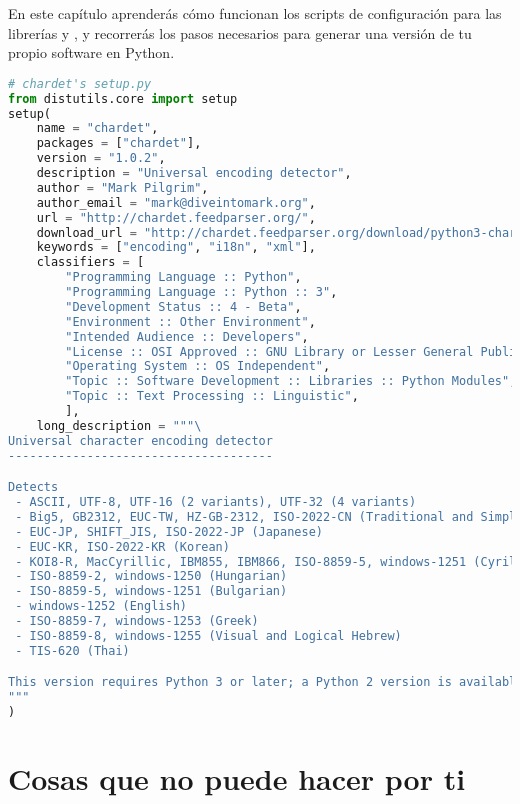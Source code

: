 En este capítulo aprenderás cómo funcionan los scripts de configuración para las librerías  y , y recorrerás los pasos necesarios para generar una versión de tu propio software en Python.

\begin{lstlisting}[language=Python,breaklines=true]
# chardet's setup.py
from distutils.core import setup
setup(
    name = "chardet",
    packages = ["chardet"],
    version = "1.0.2",
    description = "Universal encoding detector",
    author = "Mark Pilgrim",
    author_email = "mark@diveintomark.org",
    url = "http://chardet.feedparser.org/",
    download_url = "http://chardet.feedparser.org/download/python3-chardet-1.0.1.tgz",
    keywords = ["encoding", "i18n", "xml"],
    classifiers = [
        "Programming Language :: Python",
        "Programming Language :: Python :: 3",
        "Development Status :: 4 - Beta",
        "Environment :: Other Environment",
        "Intended Audience :: Developers",
        "License :: OSI Approved :: GNU Library or Lesser General Public License (LGPL)",
        "Operating System :: OS Independent",
        "Topic :: Software Development :: Libraries :: Python Modules",
        "Topic :: Text Processing :: Linguistic",
        ],
    long_description = """\
Universal character encoding detector
-------------------------------------

Detects
 - ASCII, UTF-8, UTF-16 (2 variants), UTF-32 (4 variants)
 - Big5, GB2312, EUC-TW, HZ-GB-2312, ISO-2022-CN (Traditional and Simplified Chinese)
 - EUC-JP, SHIFT_JIS, ISO-2022-JP (Japanese)
 - EUC-KR, ISO-2022-KR (Korean)
 - KOI8-R, MacCyrillic, IBM855, IBM866, ISO-8859-5, windows-1251 (Cyrillic)
 - ISO-8859-2, windows-1250 (Hungarian)
 - ISO-8859-5, windows-1251 (Bulgarian)
 - windows-1252 (English)
 - ISO-8859-7, windows-1253 (Greek)
 - ISO-8859-8, windows-1255 (Visual and Logical Hebrew)
 - TIS-620 (Thai)

This version requires Python 3 or later; a Python 2 version is available separately.
"""
)
\end{lstlisting}


\section{Cosas que  no puede hacer por ti}

